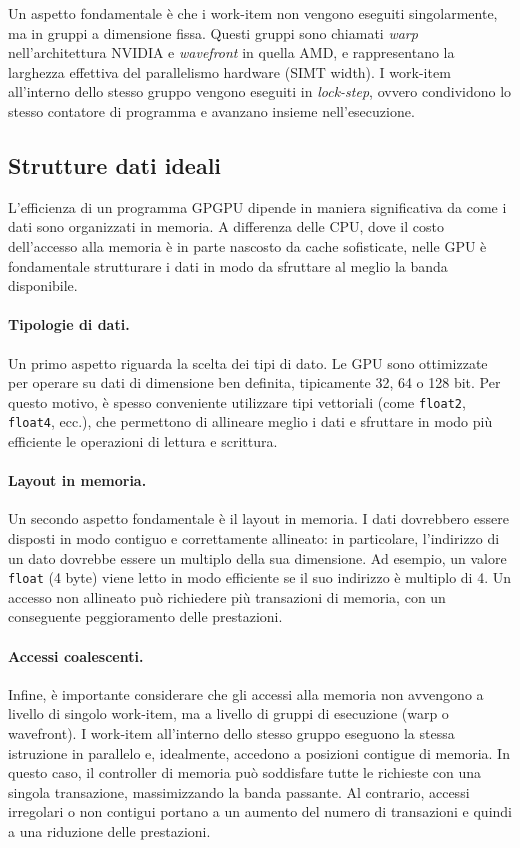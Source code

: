 Un aspetto fondamentale è che i work-item non vengono eseguiti singolarmente, ma in gruppi a dimensione fissa. Questi gruppi sono chiamati \emph{warp} nell'architettura NVIDIA e \emph{wavefront} in quella AMD, e rappresentano la larghezza effettiva del parallelismo hardware (SIMT width). I work-item all'interno dello stesso gruppo vengono eseguiti in \emph{lock-step}, ovvero condividono lo stesso contatore di programma e avanzano insieme nell'esecuzione.

\subsection{Strutture dati ideali}
L'efficienza di un programma GPGPU dipende in maniera significativa da come i dati sono organizzati in memoria. A differenza delle CPU, dove il costo dell'accesso alla memoria è in parte nascosto da cache sofisticate, nelle GPU è fondamentale strutturare i dati in modo da sfruttare al meglio la banda disponibile.

\paragraph{Tipologie di dati.}
Un primo aspetto riguarda la scelta dei tipi di dato. Le GPU sono ottimizzate per operare su dati di dimensione ben definita, tipicamente 32, 64 o 128 bit. Per questo motivo, è spesso conveniente utilizzare tipi vettoriali (come \texttt{float2}, \texttt{float4}, ecc.), che permettono di allineare meglio i dati e sfruttare in modo più efficiente le operazioni di lettura e scrittura.

\paragraph{Layout in memoria.}
Un secondo aspetto fondamentale è il layout in memoria. I dati dovrebbero essere disposti in modo contiguo e correttamente allineato: in particolare, l'indirizzo di un dato dovrebbe essere un multiplo della sua dimensione. Ad esempio, un valore \texttt{float} (4 byte) viene letto in modo efficiente se il suo indirizzo è multiplo di 4. Un accesso non allineato può richiedere più transazioni di memoria, con un conseguente peggioramento delle prestazioni.

\paragraph{Accessi coalescenti.}
Infine, è importante considerare che gli accessi alla memoria non avvengono a livello di singolo work-item, ma a livello di gruppi di esecuzione (warp o wavefront). I work-item all'interno dello stesso gruppo eseguono la stessa istruzione in parallelo e, idealmente, accedono a posizioni contigue di memoria. In questo caso, il controller di memoria può soddisfare tutte le richieste con una singola transazione, massimizzando la banda passante. Al contrario, accessi irregolari o non contigui portano a un aumento del numero di transazioni e quindi a una riduzione delle prestazioni.

